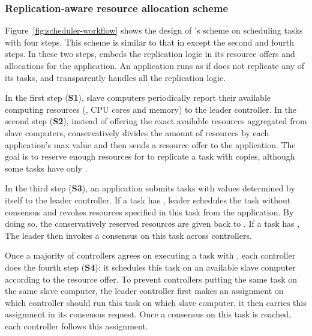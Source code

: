 \vspace{-.3in}
\subsubsection{Replication-aware resource allocation scheme}
\label{sec:workflow}\vspace{-.075in}

Figure~\ref{fig:scheduler-workflow} shows the design of \tripod's scheme on 
scheduling tasks with four steps. This scheme is similar to that in \mesos 
except the second and fourth steps. In these two steps, \tripod embeds the 
replication logic in its resource offers and allocations for the application. 
An application runs as if \xxx does not replicate any of its tasks, and \tripod 
transparently handles all the replication logic.

In the first step (\textbf{S1}), slave computers periodically report their 
available computing resources (\eg, CPU cores and memory) to the leader 
controller. In the second step (\textbf{S2}), instead of offering the exact 
available resources aggregated from slave computers, \tripod conservatively 
divides the amount of resources by each application's max  value and then 
sends a resource offer to the application. The goal is to reserve enough 
resources for \tripod to replicate a task with  copies, although some 
tasks have only .

In the third step (\textbf{S3}), an application submits tasks with  
values determined by itself to the leader controller. If a task has , 
leader schedules the task without consensus and revokes  resources 
specified in this task from the application. By doing so, the conservatively 
reserved resources are given back to \tripod. If a task has , The 
leader then invokes a consensus on this task across controllers.

Once a majority of controllers agrees on executing a task with , each 
controller does the fourth step  (\textbf{S4}): it schedules this task on an 
available slave computer according to the resource offer. To prevent 
controllers putting the same task on the same slave computer, the leader 
controller first makes an assignment on which controller should run this task on 
which slave computer, it then carries this assignment in its consensus request. 
Once a consensus on this task is reached, each controller follows this 
assignment.

